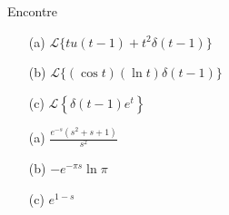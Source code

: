 \begin{Exercise}
Encontre
\begin{itemize}
  \item[(a)] $\displaystyle \mathcal{L} \big\{ t u(t-1) + t^2 \delta(t-1) \big\}$
  \item[(b)] $\displaystyle \mathcal{L} \big\{ (\cos t) ( \ln t ) \delta(t-1) \big\}$
  \item[(c)] $\displaystyle \mathcal{L}\left\{ \delta(t-1) e^t \right\}$
\end{itemize}
\end{Exercise}


\begin{Answer}
\begin{itemize}
  \item[(a)] $\displaystyle \frac{ e^{-s} (s^2 + s + 1) }{s^2}$
  \item[(b)] $\displaystyle -e^{-\pi s} \ln \pi $
  \item[(c)] $\displaystyle e^{1-s}$
  \end{itemize}
 
\end{Answer}





%